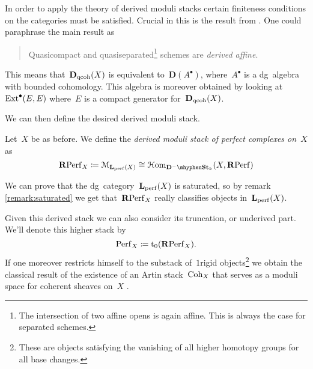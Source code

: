 \begin{refsection}
In order to apply the theory of derived moduli stacks certain finiteness conditions on the categories must be satisfied. Crucial in this is the result from \cite{bondal-vandenbergh}. One could paraphrase the main result as
\begin{quote}
  Quasicompact and quasiseparated\footnote{The intersection of two affine opens is again affine. This is always the case for separated schemes.} schemes are \emph{derived affine}.
\end{quote}
\begin{flushright}
  \cite[corollary 3.1.8]{bondal-vandenbergh}
\end{flushright}
This means that~$\mathbf{D}_{\mathrm{qcoh}}(X)$ is equivalent to~$\mathbf{D}(A^\bullet)$, where~$A^\bullet$ is a dg~algebra with bounded cohomology. This algebra is moreover obtained by looking at~$\mathrm{Ext}^\bullet(E,E)$ where~$E$ is a compact generator for~$\mathbf{D}_{\mathrm{qcoh}}(X)$.

We can then define the desired derived moduli stack.
\begin{definition}
  Let~$X$ be as before. We define the \emph{derived moduli stack of perfect complexes on~$X$} as
  \begin{equation}
    \RPerf_X\coloneqq\mathcal{M}_{\LLL_\perf(X)}\cong\HHom_{\mathbf{D}^-\mhyphen\St_k}(X,\RPerf)
  \end{equation}
\end{definition}

\begin{remark}
  We can prove that the dg~category~$\mathbf{L}_{\mathrm{perf}}(X)$ is saturated, so by remark \ref{remark:saturated} we get that~$\mathbf{R}\mathrm{Perf}_X$ really classifies objects in~$\mathbf{L}_{\mathrm{perf}}(X)$.
\end{remark}

\begin{remark}
  Given this derived stack we can also consider its truncation, or underived part. We'll denote this higher stack by
  \begin{equation}
    \mathrm{Perf}_X\coloneqq\mathrm{t}_0(\mathbf{R}\mathrm{Perf}_X).
  \end{equation}
  If one moreover restricts himself to the substack of~$1$\dash rigid objects\footnote{These are objects satisfying the vanishing of all higher homotopy groups for all base changes.} we obtain the classical result of the existence of an Artin stack~$\mathrm{Coh}_X$ that serves as a moduli space for coherent sheaves on~$X$ \cite[th\'eor\`eme 4.6.2.1]{laumon-moret-bailly} \cite[tag 08CW]{stacks}.
\end{remark}



\printbibliography[heading = local]

\end{refsection}
